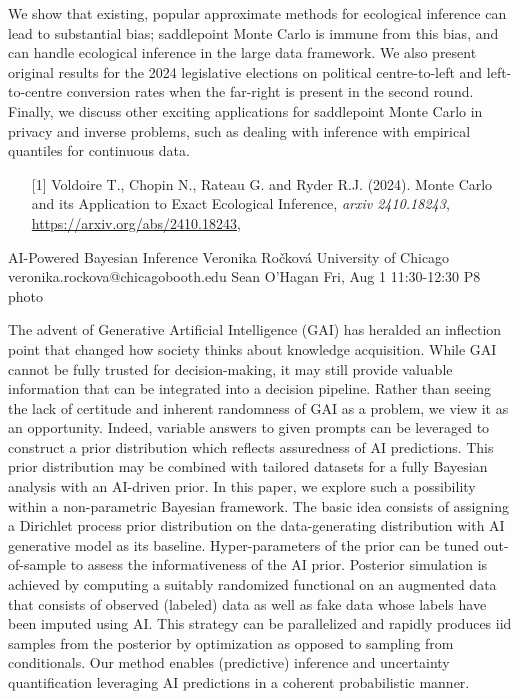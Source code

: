 \begin{talk}
We show that existing, popular approximate methods for ecological inference can
lead to substantial bias; saddlepoint Monte Carlo is immune from this bias, and 
can handle ecological inference in the large data framework. We also
present original results for the 2024 legislative elections on political
centre-to-left and left-to-centre conversion rates when the far-right is
present in the second round. Finally, we discuss other exciting applications
for saddlepoint Monte Carlo in privacy and inverse problems, such as dealing
with inference with empirical quantiles for continuous data.

\medskip

\begin{enumerate}
 \item[{[1]}] 
      Voldoire T., Chopin N., Rateau G. and Ryder R.J. (2024).
      Monte Carlo and its Application to Exact Ecological Inference, 
      \textit{arxiv 2410.18243},
      \url{https://arxiv.org/abs/2410.18243}, 
\end{enumerate}
\vspace{-10ex}
\end{talk}

\clearpage
\begin{talk}
  {AI-Powered Bayesian Inference}%
  {Veronika Ročková}%
  {University of Chicago}%
  {veronika.rockova@chicagobooth.edu}%
  {Sean O'Hagan}%
  {}%
  {Fri, Aug 1 11:30-12:30}%
  {P8}%
  {photo}%
  
    
   
The advent of Generative Artificial Intelligence (GAI) has heralded an inflection point that changed how society thinks about knowledge acquisition. While GAI cannot be fully trusted for decision-making, it may still provide valuable information that can be integrated into a decision pipeline. Rather than seeing the lack of certitude and inherent randomness of GAI as a problem, we view it as an opportunity. Indeed, variable answers to given prompts can be leveraged to construct a prior distribution which reflects assuredness of AI predictions. This prior distribution may be combined with tailored datasets for a fully Bayesian analysis with an AI-driven prior. In this paper, we explore such a possibility within a non-parametric Bayesian framework. The basic idea consists of assigning a Dirichlet process prior distribution on the data-generating distribution with AI generative model as its baseline. Hyper-parameters of the prior can be tuned out-of-sample to assess the informativeness of the AI prior. Posterior simulation is achieved by computing a suitably randomized functional on an augmented data that consists of observed (labeled) data as well as fake data whose labels have been imputed using AI. This strategy can be parallelized and rapidly produces iid samples from the posterior by optimization as opposed to sampling from conditionals. Our method enables (predictive) inference and uncertainty quantification leveraging AI predictions in a coherent probabilistic manner.

\medskip

\end{talk}

